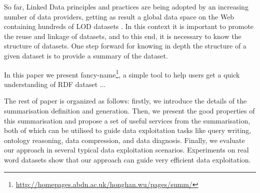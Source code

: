So far, Linked Data principles and practices are being adopted by an increasing number of data providers, getting as result a global data space on the Web containing hundreds of LOD datasets \cite{Heath_Bizer_2011}. In this context it is important to promote the reuse and linkage of datasets, and to this end, it is necessary to know the structure of datasets. One step forward for knowing in depth the structure of a given dataset is to provide a summary of the dataset.

In this paper we present fancy-name\footnote{\footnotesize \url{http://homepages.abdn.ac.uk/honghan.wu/pages/summ/}}, a simple tool to help users get a quick understanding of RDF dataset ...

The rest of paper is organized as follows: firstly, we introduce the details of the summarisation definition and generation. Then, we present the good properties of this summarisation and propose a set of useful services from the summarisation, both of which can be utilised to guide data exploitation tasks like query writing, ontology reasoning, data compression, and data diagnosis. Finally, we evaluate our approach in several typical data exploitation scenarios. Experiments on real word datasets show that our approach can guide very efficient data exploitation.

